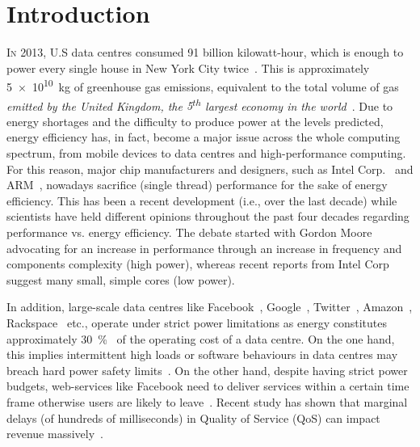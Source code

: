 \chapter{Introduction}
\label{chapter: introduction} 

 \lettrine{I}{n} 2013, U.S data centres consumed 91 billion kilowatt-hour,
which is enough to power every single house in New York City
twice~\citep{Delforge2014DataAssessment, powerforbes}. This is approximately
\SI{5e10}{\kilo\gram} of greenhouse gas emissions, equivalent to the total volume of gas
\emph{emitted by the United Kingdom, the \textrm{5\textsuperscript{$\mathit{th}$}} largest
economy in the world}~\citep{co2emissions}. Due to energy shortages and the difficulty to
produce power at the levels predicted, energy efficiency has, in fact, become a major
issue across the whole computing spectrum, from mobile devices to data centres and
high-performance computing. For this reason, major chip manufacturers and designers, such
as Intel Corp.~\citep{mlawend2} and ARM~\citep{montblanc}, nowadays sacrifice (single
thread) performance for the sake of energy efficiency.  This has been a recent development
(i.e., over the last decade) while scientists have held different opinions throughout the
past four decades regarding performance vs. energy efficiency.  The debate started with
Gordon Moore~\citep{FM1000} advocating for an increase in performance through an increase
in frequency and components complexity (high power), whereas recent reports from Intel
Corp~\citep{mlawend2} suggest many small, simple cores (low power).




 In addition, large-scale data centres like Facebook~\citep{facebook},
Google~\citep{googlesearch}, Twitter~\citep{twitter}, Amazon~\citep{ec2pricing},
Rackspace~\citep{rack} etc., operate under strict power limitations as energy constitutes
approximately \SI{30}{\percent}~\citep{pdata1,pdata2} of the operating cost of a data
centre. On the one hand, this implies intermittent high loads or software behaviours in
data centres may breach hard power safety
limits~\citep{Bhattacharya:2012:NSS:2410145.2410772}.  On the other hand, despite having
strict power budgets, web-services like Facebook need to deliver services within a certain
time frame otherwise users are likely to leave~\citep{WuDynamo:System}.  Recent study has
shown that marginal delays (of hundreds of milliseconds) in Quality of Service (QoS) can
impact revenue massively~\citep{Eric2009TheSearch}.

